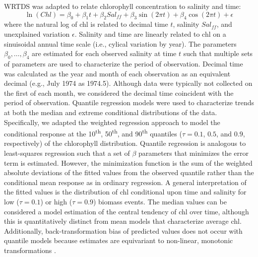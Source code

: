 \documentclass{svjour3}\usepackage[]{graphicx}\usepackage[]{color}
\begin{document}
\ac{WRTDS} was adapted to relate chlorophyll concentration to salinity and time:
\begin{equation}\label{eqn:funform}
\ln\left(Chl\right) = \beta_0 + \beta_1 t + \beta_2 Sal_{ff} + \beta_3 \sin\left(2\pi t\right) + \beta_4 \cos\left(2\pi t\right) + \epsilon
\end{equation}
\noindent where the natural log of \ac{chl} is related to decimal time $t$, salinity $Sal_{ff}$, and unexplained variation $\epsilon$.  Salinity and time are linearly related to \ac{chl} on a sinuisoidal annual time scale (i.e., cylical variation by year). The parameters $\beta_0,\ldots,\beta_4$ are estimated for each observed salinity at time $t$ such that multiple sets of parameters are used to characterize the period of observation.  Decimal time was calculated as the year and month of each observation as an equivalent decimal (e.g., July 1974 as 1974.5).  Although data were typically not collected on the first of each month, we considered the decimal time coincident with the period of observation.  Quantile regression models \cite{Cade03} were used to characterize trends at both the median and extreme conditional distributions of the data.  Specifically, we adapted the weighted regression approach to model the conditional response at the 10\textsuperscript{th}, 50\textsuperscript{th}, and 90\textsuperscript{th} quantiles ($\tau=0.1$, $0.5$, and $0.9$, respectively) of the chlorophyll distribution. Quantile regression is analogous to least-squares regression such that a set of $\beta$ parameters that minimizes the error term is estimated.  However, the minimization function is the sum of the weighted absolute deviations of the fitted values from the observed quantile rather than the conditional mean response as in ordinary regression.  A general interpretation of the fitted values is the distribution of \ac{chl} conditional upon time and salinity for low ($\tau=0.1$) or high ($\tau=0.9$) biomass events.  The median values can be considered a model estimation of the central tendency of \ac{chl} over time, although this is quantitatively distinct from mean models that characterize average \ac{chl}.  Additionally, back-transformation bias of predicted values does not occur with quantile models because estimates are equivariant to non-linear, monotonic transformations \cite{Koenker08}. 
\end{document}
